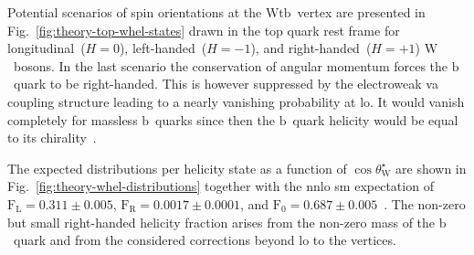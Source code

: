 Potential scenarios of spin orientations at the $\mathrm{Wtb}$~vertex are presented in Fig.~\ref{fig:theory-top-whel-states} drawn in the top quark rest frame for longitudinal~($H=0$), left-handed~($H=-1$), and right-handed~($H=+1$) $\mathrm{W}$~bosons. In the last scenario the conservation of angular momentum forces the $\mathrm{b}$~quark to be right-handed. This is however suppressed by the electroweak \gls{va} coupling structure leading to a nearly vanishing probability at \gls{lo}. It would vanish completely for massless $\mathrm{b}$~quarks since then the $\mathrm{b}$~quark helicity would be equal to its chirality~\cite{Bernreuther:2008ju}.


The expected distributions per helicity state as a function of $\cos\theta^\star_\mathrm{W}$ are shown in Fig.~\ref{fig:theory-whel-distributions} together with the \gls{nnlo} \gls{sm} expectation of $\mathrm{F}_\mathrm{L}=0.311\pm0.005$, $\mathrm{F}_\mathrm{R}=0.0017\pm0.0001$, and $\mathrm{F}_{0}=0.687\pm0.005$~\cite{Czarnecki:2010gb}. The non-zero but small right-handed helicity fraction arises from the non-zero mass of the $\mathrm{b}$~quark and from the considered corrections beyond \gls{lo} to the vertices.
 

